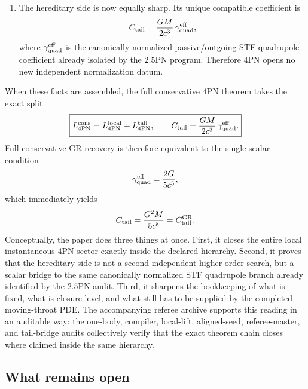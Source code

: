 \documentclass[11pt]{article}
\begin{document}
\begin{enumerate}
  \item The hereditary side is now equally sharp.  Its unique compatible
  coefficient is
  \begin{equation}
  C_{\rm tail}
  =
  \frac{GM}{2c^3}\,\gamma_{\rm quad}^{\rm eff},
  \label{eq:conclusions-tail-bridge-4pn}
  \end{equation}
  where $\gamma_{\rm quad}^{\rm eff}$ is the canonically normalized
  passive/outgoing STF quadrupole coefficient already isolated by the $2.5$PN
  program.  Therefore $4$PN opens no new independent normalization datum.
\end{enumerate}

When these facts are assembled, the full conservative $4$PN theorem takes the
exact split
\begin{equation}
\boxed{
L_{4\mathrm{PN}}^{\mathrm{cons}}
=
L_{4\mathrm{PN}}^{\mathrm{local}}
+
L_{4\mathrm{PN}}^{\mathrm{tail}},
\qquad
C_{\rm tail}
=
\frac{GM}{2c^3}\,\gamma_{\rm quad}^{\rm eff}.
}
\label{eq:conclusions-final-split-4pn}
\end{equation}
Full conservative GR recovery is therefore equivalent to the single scalar
condition
\begin{equation}
\gamma_{\rm quad}^{\rm eff}=\frac{2G}{5c^5},
\label{eq:conclusions-gamma-target-4pn}
\end{equation}
which immediately yields
\begin{equation}
C_{\rm tail}=\frac{G^2M}{5c^8}=C_{\rm tail}^{\rm GR}.
\label{eq:conclusions-tail-gr-4pn}
\end{equation}
Conceptually, the paper does three things at once.  First, it closes the entire
local instantaneous $4$PN sector exactly inside the declared hierarchy.
Second, it proves that the hereditary side is not a second independent
higher-order search, but a scalar bridge to the same canonically normalized STF
quadrupole branch already identified by the $2.5$PN audit.  Third, it sharpens
the bookkeeping of what is fixed, what is closure-level, and what still has to
be supplied by the completed moving-throat PDE.  The accompanying referee
archive supports this reading in an auditable way: the one-body, compiler,
local-lift, aligned-seed, referee-master, and tail-bridge audits collectively
verify that the exact theorem chain closes where claimed inside the same
hierarchy.

\subsection{What remains open}
\label{sec:conclusions-open}
\end{document}
